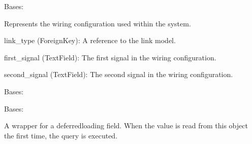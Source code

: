 \documentclass[letterpaper,10pt,english]{sphinxmanual}
\begin{document}
\begin{fulllineitems}
\label{\detokenize{app:app.models.wirings}}
\pysigstartsignatures
{}
\pysigstopsignatures
\sphinxAtStartPar
Bases: 

\sphinxAtStartPar
Represents the wiring configuration used within the system.
\begin{description}
\sphinxAtStartPar
link\_type (ForeignKey): A reference to the link model.

\sphinxAtStartPar
first\_signal (TextField): The first signal in the wiring configuration.

\sphinxAtStartPar
second\_signal (TextField): The second signal in the wiring configuration.

\end{description}

\begin{fulllineitems}
\label{\detokenize{app:app.models.wirings.DoesNotExist}}
\pysigstartsignatures
{}
\pysigstopsignatures
\sphinxAtStartPar
Bases: 

\end{fulllineitems}


\begin{fulllineitems}
\label{\detokenize{app:app.models.wirings.MultipleObjectsReturned}}
\pysigstartsignatures
{}
\pysigstopsignatures
\sphinxAtStartPar
Bases: 

\end{fulllineitems}


\begin{fulllineitems}
\label{\detokenize{app:app.models.wirings.first_signal}}
\pysigstartsignatures
{}
\pysigstopsignatures
\sphinxAtStartPar
A wrapper for a deferred\sphinxhyphen{}loading field. When the value is read from this
object the first time, the query is executed.


\end{fulllineitems}
\end{fulllineitems}
\end{document}
